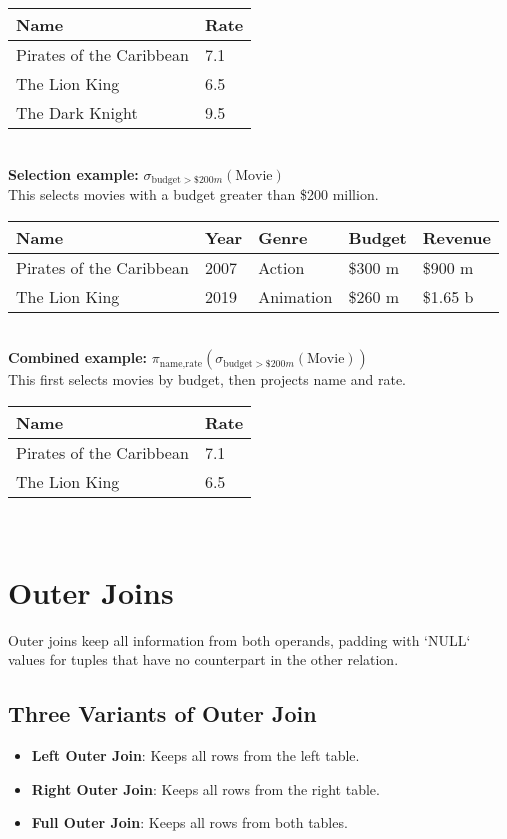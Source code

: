 \documentclass{article}
\newcommand{\sel}{\sigma} %
\newcommand{\proj}{\pi} %
\begin{document}
\begin{tabular}{|l|l|}
    \hline
    \textbf{Name} & \textbf{Rate} \\
    \hline
    Pirates of the Caribbean & 7.1 \\
    The Lion King & 6.5 \\
    The Dark Knight & 9.5 \\
    \hline
\end{tabular}\\


\textbf{Selection example:} $\sel_{\text{budget}>\$200m}(\text{Movie})$ \\

This selects movies with a budget greater than \$200 million.\\

\begin{tabular}{|l|l|l|l|l|}
    \hline
    \textbf{Name} & \textbf{Year} & \textbf{Genre} & \textbf{Budget} & \textbf{Revenue} \\
    \hline
    Pirates of the Caribbean & 2007 & Action & \$300 m & \$900 m \\
    The Lion King & 2019 & Animation & \$260 m & \$1.65 b \\
    \hline
\end{tabular}\\


\textbf{Combined example:} $\proj_{\text{name,rate}}(\sel_{\text{budget}>\$200m}(\text{Movie}))$ \\

This first selects movies by budget, then projects name and rate.\\

\begin{tabular}{|l|l|}
    \hline
    \textbf{Name} & \textbf{Rate} \\
    \hline
    Pirates of the Caribbean & 7.1 \\
    The Lion King & 6.5 \\
    \hline
\end{tabular}\\


\section*{Outer Joins} 
Outer joins keep all information from both operands, padding with `NULL` values for tuples that have no counterpart in the other relation. 

\subsection*{Three Variants of Outer Join} 
\begin{itemize}
    \item \textbf{Left Outer Join}: Keeps all rows from the left table. 
    \item \textbf{Right Outer Join}: Keeps all rows from the right table. 
    \item \textbf{Full Outer Join}: Keeps all rows from both tables. 
\end{itemize}
\end{document}
